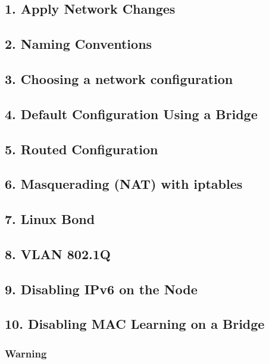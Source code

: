 \subsection{1. Apply Network Changes}

\subsection{2. Naming Conventions}

\subsection{3. Choosing a network configuration}

\subsection{4. Default Configuration Using a Bridge}

\subsection{5. Routed Configuration}

\subsection{6. Masquerading (NAT) with iptables}

\subsection{7. Linux Bond}

\subsection{8. VLAN 802.1Q}

\subsection{9. Disabling IPv6 on the Node}

\subsection{10. Disabling MAC Learning on a Bridge}

\subsubsection{Warning}

